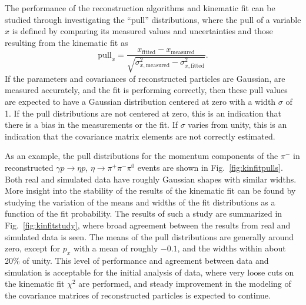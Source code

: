 The performance of the reconstruction algorithms and kinematic fit can be studied through investigating the ``pull'' distributions, where the pull of a variable $x$ is defined by comparing its measured values and uncertainties and those resulting from the kinematic fit as
\begin{equation}
    \text{pull}_x = \frac{x_\text{fitted} - x_\text{measured}}{\sqrt{\sigma_{x,\text{measured}}^2 - \sigma_{x,\text{fitted}}^2}}.
\end{equation}
If the parameters and covariances of reconstructed particles are Gaussian, are measured accurately, and the fit is performing correctly, then these pull values are expected to have a Gaussian distribution centered at zero with a width $\sigma$ of 1.  If the pull distributions are not centered at zero, this is an indication that there is a bias in the measurements or the fit.  If $\sigma$ varies from unity, this is an indication that the covariance matrix elements are not correctly estimated.  

As an example, the pull distributions for the momentum components of the $\pi^-$ in reconstructed $\gamma p \to \eta p$, $\eta \to \pi^+\pi^-\pi^0$ events are shown in Fig.~\ref{fig:kinfitpulls}.  Both real and simulated data have roughly Gaussian shapes with similar widths.  More insight into the stability of the results of the kinematic fit can be found by studying the variation of the means and widths of the fit distributions as a function of the fit probability.  The results of such a study are summarized in Fig.~\ref{fig:kinfitstudy}, where broad agreement between the results from real and simulated data is seen.  The means of the pull distributions are generally around zero, except for $p_x$ with a mean of roughly $-0.1$, and the widths within about 20\% of unity.  This level of performance and agreement between data and simulation is acceptable for the initial analysis of data, where very loose cuts on the kinematic fit $\chi^2$ are performed, and steady improvement in the modeling of the covariance matrices of reconstructed particles is expected to continue.


